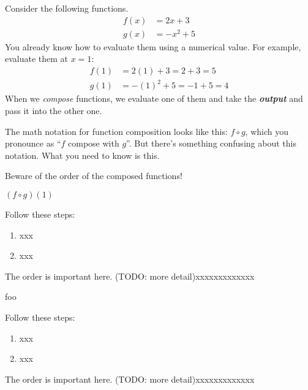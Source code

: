\documentclass[fleqn,letterpaper,12pt,printwatermark=true]{memoir}
\begin{document}
\begin{myLesson}[][1]
Consider the following functions.
\begin{align*}
    f(x) &= 2x + 3 \\
    g(x) &= -x^2 + 5
\end{align*}
You already know how to evaluate them using a numerical value.
For example, evaluate them at $x=1$:
\begin{align*}
    f(1) &= 2(1) + 3 = 2+3 = 5\\
    g(1) &= -(1)^2 + 5 = -1 + 5 = 4
\end{align*}
When we \emph{compose} functions, 
we evaluate one of them and take the {\bfseries\itshape output} and pass it 
into the other one.

The math notation for function composition looks like this:
$f \circ g$,
which you pronounce as ``$f$ compose with $g$''. 
But there's something confusing about this notation.
What you need to know is this.

\begin{myLessonBox}
    Beware of the order of the composed functions!

    $(f \circ g)(1)$ 
\end{myLessonBox}



\end{myLesson}
\begin{myKeyConcepts}
    Follow these steps:
    \begin{enumerate}
        \item xxx
        \item xxx
    \end{enumerate}
    The order is important here. (TODO: more detail)xxxxxxxxxxxxx
\end{myKeyConcepts}



\begin{myLesson}[2]
    foo
\end{myLesson}

\begin{myKeyConcepts}
    Follow these steps:
    \begin{enumerate}
        \item xxx
        \item xxx
    \end{enumerate}
    The order is important here. (TODO: more detail)xxxxxxxxxxxxx
\end{myKeyConcepts}



  
\end{document}
